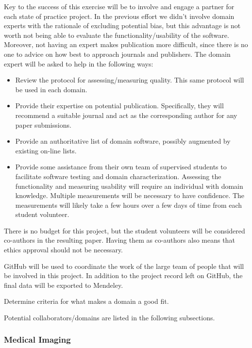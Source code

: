 \documentclass[12pt]{article}
\begin{document}
Key to the success of this exercise will be to involve and engage a partner for
each state of practice project.  In the previous effort we didn't involve domain
experts with the rationale of excluding potential bias, but this advantage is
not worth not being able to evaluate the functionality/usability of the software.
Moreover, not having an expert makes publication more difficult, since there is
no one to advice on how best to approach journals and publishers.  The domain
expert will be asked to help in the following ways:

\begin{itemize}
\item Review the protocol for assessing/measuring quality.  This same protocol
  will be used in each domain.
\item Provide their expertise on potential publication.  Specifically, they will
  recommend a suitable journal and act as the corresponding author for any paper
  submissions. 
\item Provide an authoritative list of domain software, possibly augmented by
  existing on-line lists.
\item Provide some assistance from their own team of supervised students to
  facilitate software testing and domain characterization.  Assessing the
  functionality and measuring usability will require an individual with domain
  knowledge.  Multiple measurements will be necessary to have confidence.  The
  measurements will likely take a few hours over a few days of time from each
  student volunteer.
\end{itemize}

There is no budget for this project, but the student volunteers will be
considered co-authors in the resulting paper.  Having them as co-authors also
means that ethics approval should not be necessary.

GitHub will be used to coordinate the work of the large team of people that will
be involved in this project.  In addition to the project record left on GitHub,
the final data will be exported to Mendeley.

Determine criteria for what makes a domain a good fit.

Potential collaborators/domains are listed in the following subsections.

\subsubsection{Medical Imaging}
\end{document}
